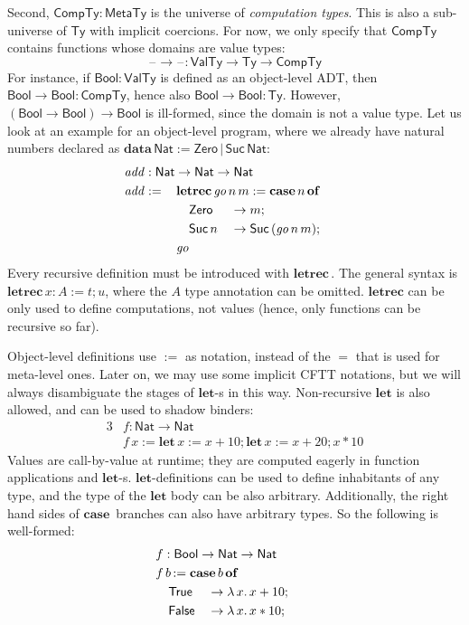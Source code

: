 \documentclass[acmsmall,screen,review,anonymous]{acmart}
\newcommand{\mit}[1]{\mathit{#1}}
\newcommand{\msf}[1]{\mathsf{#1}}
\newcommand{\mbf}[1]{\mathbf{#1}}
\newcommand{\bs}[1]{\boldsymbol{#1}}
\newcommand{\ind}{\hspace{1em}}
\newcommand{\lam}{\lambda\,}
\newcommand{\data}{\mbf{data}\,}
\newcommand{\letrec}{\mbf{letrec}\,}
\newcommand{\of}{\mbf{of}\,}
\newcommand{\go}{\mit{go}}
\newcommand{\add}{\mit{add}}
\newcommand{\letdef}{\mbf{let\,}}
\newcommand{\Bool}{\msf{Bool}}
\newcommand{\case}{\mbf{case\,}}
\newcommand{\MTy}{\msf{MetaTy}}
\newcommand{\VTy}{\msf{ValTy}}
\newcommand{\Ty}{\msf{Ty}}
\newcommand{\CTy}{\msf{CompTy}}
\newcommand{\True}{\msf{True}}
\newcommand{\False}{\msf{False}}
\newcommand{\blank}{{\mathord{\hspace{1pt}\text{--}\hspace{1pt}}}}
\newcommand{\Nat}{\msf{Nat}}
\newcommand{\Zero}{\msf{Zero}}
\newcommand{\Suc}{\msf{Suc}}
\theoremstyle{remark}
\begin{document}
Second, $\bs{\CTy} : \MTy$ is the universe of \emph{computation types}. This is
also a sub-universe of $\Ty$ with implicit coercions. For now, we only specify
that $\CTy$ contains functions whose domains are value types:
\[ \blank\to\blank : \VTy \to \Ty \to \CTy \]
For instance, if $\Bool : \VTy$ is defined as an object-level ADT, then $\Bool
\to \Bool : \CTy$, hence also $\Bool \to \Bool : \Ty$. However, $(\Bool \to
\Bool) \to \Bool$ is ill-formed, since the domain is not a value type. Let us look at an
example for an object-level program, where we already have natural numbers
declared as $\data \Nat := \Zero\,|\,\Suc\,\Nat$:
\begin{alignat*}{3}
  &\hspace{-1em}\rlap{$\add : \Nat \to \Nat \to \Nat$}\\
  &\hspace{-1em}\add :=\,&& \mathrlap{\letrec \go\,n\,m := \case n\,\of}\\
  &\hspace{-1em}         && \ind \Zero   &&\to m;\\
  &\hspace{-1em}         && \ind \Suc\,n &&\to \Suc\,(\go\,n\,m);\\
  &\hspace{-1em}         && \go
\end{alignat*}
Every recursive definition must be introduced with $\letrec$. The general syntax
is $\letrec x : A := t; u$, where the $A$ type annotation can be
omitted. $\mbf{letrec}$ can be only used to define computations, not values
(hence, only functions can be recursive so far).

Object-level definitions use $:=$ as notation, instead of the $=$ that is used
for meta-level ones. Later on, we may use some implicit CFTT notations, but we
will always disambiguate the stages of $\mbf{let}$-s in this way. Non-recursive
$\mbf{let}$ is also allowed, and can be used to shadow binders:
\begin{alignat*}{3}
  &f : \Nat \to \Nat\\
  &f\,x := \letdef x := x + 10; \letdef x := x + 20; x * 10
\end{alignat*}
Values are call-by-value at runtime; they are computed eagerly in function
applications and $\mbf{let}$-s. $\mbf{let}$-definitions can be used to define
inhabitants of any type, and the type of the $\mbf{let}$ body can be also
arbitrary. Additionally, the right hand sides of $\case$ branches can also have
arbitrary types. So the following is well-formed:
\begin{alignat*}{3}
  &\hspace{-1em}f : \mathrlap{\Bool \to \Nat \to \Nat}\\
  &\hspace{-1em}f\,b\,\mathrlap{:= \case b\,\of}\\
  &\hspace{-1em}\ind \True  &&\to \lam x.\, x + 10;\\
  &\hspace{-1em}\ind \False &&\to \lam x.\, x * 10;
\end{alignat*}
\end{document}

